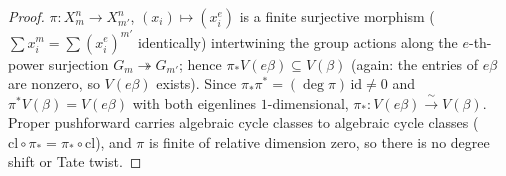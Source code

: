 \documentclass[10pt,a4paper]{amsart}
\newcommand{\V}{V}
\begin{document}
\begin{proof}
$\pi\colon X^n_m\to X^n_{m'}$, $(x_i)\mapsto(x_i^e)$ is a finite surjective morphism
($\sum x_i^m=\sum(x_i^e)^{m'}$ identically) intertwining the group actions along the $e$-th-power
surjection $G_m\twoheadrightarrow G_{m'}$; hence $\pi_*\V(e\beta)\subseteq\V(\beta)$ (again: the entries of $e\beta$ are nonzero, so $\V(e\beta)$ exists). Since
$\pi_*\pi^*=(\deg\pi)\,\mathrm{id}\neq0$ and $\pi^*\V(\beta)=\V(e\beta)$ with both eigenlines
$1$-dimensional, $\pi_*\colon\V(e\beta)\xrightarrow{\ \sim\ }\V(\beta)$. Proper pushforward carries
algebraic cycle classes to algebraic cycle classes ($\mathrm{cl}\circ\pi_*=\pi_*\circ\mathrm{cl}$),
and $\pi$ is finite of relative dimension zero, so there is no degree shift or Tate twist.
\end{proof}
\end{document}
